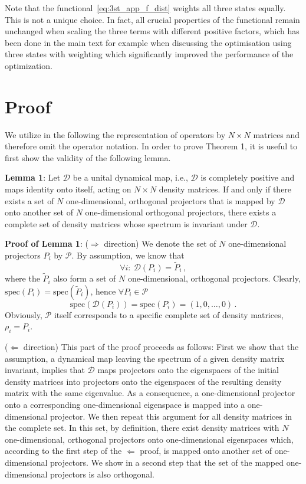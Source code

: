 Note that the functional~\eqref{eq:3st_app_f_dist} weights
all three states equally. This is not a unique choice. In fact, all
crucial properties of the functional remain unchanged when scaling the
three terms with different positive factors, which has been done in the
main text for example when discussing the optimisation using three states
with weighting which significantly improved the performance of the
optimization.

\section{Proof}
\label{sec:3_states_proofs}

We utilize in the following the representation of operators by
$N\times N$ matrices and therefore omit the operator notation.
In order to prove Theorem 1, it is useful
to first show the validity of the following lemma.

\textbf{Lemma 1}:
Let $\mathcal{D}$ be a unital dynamical map, i.e.,
$\mathcal D$ is completely positive and maps identity onto itself,
acting on $N \times N$
density matrices. If and only if there exists a set of $N$
one-dimensional, orthogonal projectors that is mapped by $\mathcal{D}$
onto another set of $N$
one-dimensional orthogonal projectors,
there exists a complete set of density matrices whose spectrum is invariant
under $\mathcal{D}$.

\textbf{Proof of Lemma 1}: ($\Longrightarrow$ direction) We denote the set of
$N$ one-dimensional projectors $P_{i}$ by $\mathcal{P}$.
By assumption, we know that
\begin{equation*}
\forall i:\ \mathcal{D}\left(P_{i}\right)=\tilde{P}_{i} \,,
\end{equation*}
where the $\tilde{P}_{i}$ also form a set of $N$
one-dimensional, orthogonal projectors.
Clearly, $\text{spec}\left(P_{i}\right)=\text{spec}(\tilde{P}_{i})$,
hence $\forall P_i\in\mathcal{P}$
\begin{equation*}
\text{spec}\left(\mathcal{D}\left(P_i\right)\right)=
\text{spec}\left(P_i\right) = (1,0,\dots,0)\,.
\end{equation*}
Obviously, $\mathcal{P}$ itself corresponds to a specific complete set of
density matrices, $\rho_i=P_i$.

($\Longleftarrow$ direction)
This part of the proof proceeds as follows: First we show that the
assumption, a dynamical map leaving the spectrum of a given density
matrix invariant, implies that $\mathcal D$ maps projectors onto
the eigenspaces of the initial density matrices
into projectors onto the eigenspaces of the resulting density matrix
with the same eigenvalue. As a consequence, a one-dimensional projector
onto a corresponding one-dimensional eigenspace is mapped into a
one-dimensional projector.
We then repeat this argument for all density matrices in the complete
set. In this set, by definition, there exist density matrices with $N$
one-dimensional, orthogonal projectors onto one-dimensional
eigenspaces which, according to the first step of the $\Longleftarrow$
proof, is mapped onto another set of one-dimensional projectors. We
show in a second step
that the set of the mapped one-dimensional projectors is also orthogonal.

